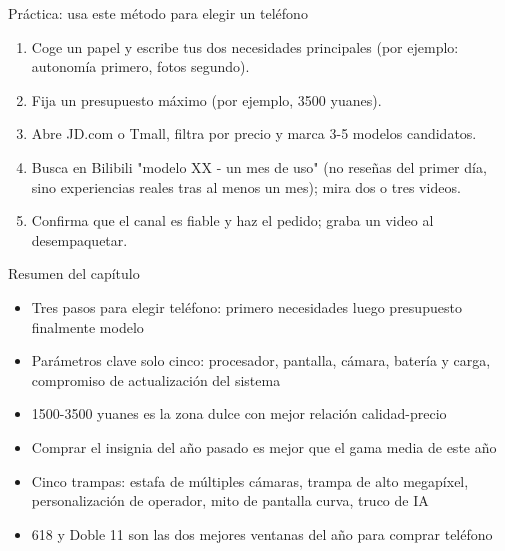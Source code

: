 \begin{tcbpractice}{Práctica: usa este método para elegir un teléfono}
\begin{enumerate}
  \item Coge un papel y escribe tus dos necesidades principales (por ejemplo: autonomía primero, fotos segundo).
  \item Fija un presupuesto máximo (por ejemplo, 3500 yuanes).
  \item Abre JD.com o Tmall, filtra por precio y marca 3-5 modelos candidatos.
  \item Busca en Bilibili "modelo XX - un mes de uso" (no reseñas del primer día, sino experiencias reales tras al menos un mes); mira dos o tres videos.
  \item Confirma que el canal es fiable y haz el pedido; graba un video al desempaquetar.
\end{enumerate}

\end{tcbpractice}

\begin{tcbsummary}{Resumen del capítulo}
\begin{itemize}
  \item Tres pasos para elegir teléfono: primero necesidades luego presupuesto finalmente modelo
  \item Parámetros clave solo cinco: procesador, pantalla, cámara, batería y carga, compromiso de actualización del sistema
  \item 1500-3500 yuanes es la zona dulce con mejor relación calidad-precio
  \item Comprar el insignia del año pasado es mejor que el gama media de este año
  \item Cinco trampas: estafa de múltiples cámaras, trampa de alto megapíxel, personalización de operador, mito de pantalla curva, truco de IA
  \item 618 y Doble 11 son las dos mejores ventanas del año para comprar teléfono
\end{itemize}

\end{tcbsummary}
